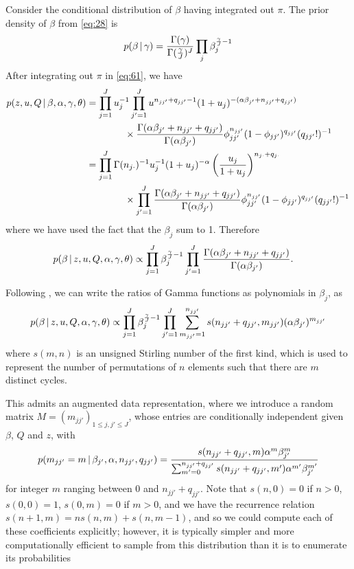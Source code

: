 Consider the conditional distribution of $\beta$ having integrated out
$\pi$.  The prior density of $\beta$ from \eqref{eq:28} is
\begin{equation}
  \label{eq:62} p(\beta \, \vert \, \gamma) =
\frac{\Gamma(\gamma)}{\Gamma(\frac{\gamma}{J})^J} \prod_{j}
\beta_j^{\frac{\gamma}{J} - 1}
\end{equation} After integrating out $\pi$ in \eqref{eq:61}, we have
\begin{align} p(z, u, Q \, \vert \, \beta, \alpha, \gamma, \theta) &=
\prod_{j=1}^J u_{j} ^{-1} \prod_{j'=1}^J u^{n_{jj'} + q_{jj'} - 1}(1 +
u_j)^{-(\alpha\beta_{j'} + n_{jj'} + q_{jj'})} \\ &\qquad \qquad
\times \frac{\Gamma(\alpha\beta_{j'} + n_{jj'} +
q_{jj'})}{\Gamma(\alpha\beta_{j'})}
\phi_{jj'}^{n_{jj'}}(1-\phi_{jj'})^{q_{jj'}} (q_{jj'}!)^{-1} \\ &=
\prod_{j=1}^J \Gamma(n_{j\cdot})^{-1} u_j^{-1}(1+u_j)^{-\alpha}
\left(\frac{u_j}{1+u_j}\right)^{n_{j\cdot} + q_{j\cdot}} \\ &\qquad
\qquad \times \prod_{j' = 1}^J \frac{\Gamma(\alpha\beta_{j'} + n_{jj'}
+ q_{jj'})}{\Gamma(\alpha\beta_{j'})}
\phi_{jj'}^{n_{jj'}}(1-\phi_{jj'})^{q_{jj'}} (q_{jj'}!)^{-1}
\end{align} where we have used the fact that the $\beta_j$ sum to 1.
Therefore
\begin{align} p(\beta \, \vert \, z, u, Q, \alpha, \gamma, \theta) &\propto
\prod_{j=1}^J \beta_j^{\frac{\gamma}{J} - 1} \prod_{j'=1}^J
\frac{\Gamma(\alpha\beta_{j'} + n_{jj'} +
q_{jj'})}{\Gamma(\alpha\beta_{j'})}.
\end{align}

Following \citep{teh2006hierarchical}, we can write the ratios of
Gamma functions as polynomials in $\beta_j$, as
\begin{equation}
  \label{eq:31} p(\beta \, \vert \, z, u, Q, \alpha, \gamma, \theta)
\propto \prod_{j=1}^J \beta_j^{\frac{\gamma}{J} - 1} \prod_{j'=1}^{J}
\sum_{m_{jj'} = 1}^{n_{jj'}} s(n_{jj'} + q_{jj'}, m_{jj'}) (\alpha
\beta_{j'})^{m_{jj'}}
\end{equation} where $s(m,n)$ is an unsigned Stirling number of the
first kind, which is used to represent the number of permutations of
$n$ elements such that there are $m$ distinct cycles.

This admits an augmented data representation, where we introduce a
random matrix $M = (m_{jj'})_{1 \leq j,j' \leq J}$, whose entries are
conditionally independent given $\beta$, $Q$ and $z$, with
\begin{equation}
  \label{eq:32} p(m_{jj'} = m \, \vert \, \beta_{j'}, \alpha, n_{jj'},
q_{jj'}) = \frac{s(n_{jj'} + q_{jj'}, m) \alpha^{m}
\beta_{j'}^{m}}{\sum_{m'=0}^{n_{jj'} + q_{jj'}} s(n_{jj'} + q_{jj'},
m') \alpha^{m'} \beta_{j'}^{m'}}
\end{equation} for integer $m$ ranging between $0$ and $n_{jj'} +
q_{jj'}$.  Note that $s(n,0) = 0$ if $n > 0$, $s(0,0) = 1$, $s(0,m) =
0$ if $m > 0$, and we have the recurrence relation $s(n+1,m) = n
s(n,m) + s(n,m-1)$, and so we could compute each of these coefficients
explicitly; however, it is typically simpler and more computationally
efficient to sample from this distribution than it is to enumerate its
probabilities


